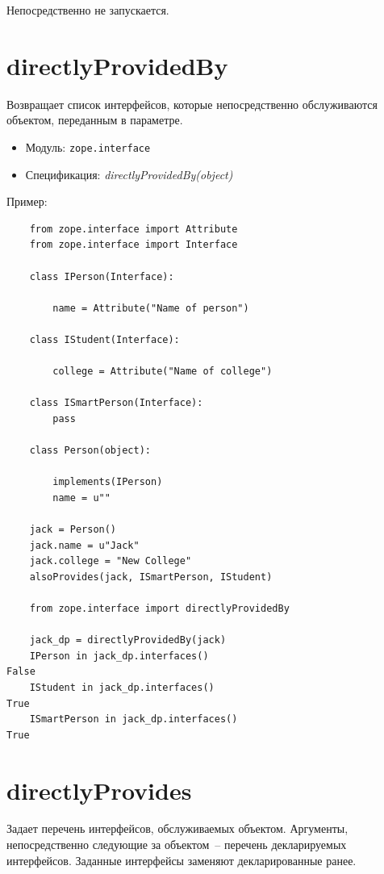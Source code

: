 \documentclass[a4paper,openany,twoside,final]{book}
\providecommand*{\DUroletitlereference}[1]{\textsl{#1}}
\begin{document}
Непосредственно не запускается.


\section*{directlyProvidedBy%
  \label{directlyprovidedby}%
}

Возвращает список интерфейсов, которые непосредственно обслуживаются объектом, переданным в параметре.

\begin{itemize}

\item Модуль: \texttt{zope.interface}

\item Спецификация: \DUroletitlereference{directlyProvidedBy(object)}

\end{itemize}

Пример:

\begin{verbatim}
    from zope.interface import Attribute
    from zope.interface import Interface

    class IPerson(Interface):

        name = Attribute("Name of person")

    class IStudent(Interface):

        college = Attribute("Name of college")

    class ISmartPerson(Interface):
        pass

    class Person(object):

        implements(IPerson)
        name = u""

    jack = Person()
    jack.name = u"Jack"
    jack.college = "New College"
    alsoProvides(jack, ISmartPerson, IStudent)

    from zope.interface import directlyProvidedBy

    jack_dp = directlyProvidedBy(jack)
    IPerson in jack_dp.interfaces()
False
    IStudent in jack_dp.interfaces()
True
    ISmartPerson in jack_dp.interfaces()
True
\end{verbatim}


\section*{directlyProvides%
  \label{directlyprovides}%
}

Задает перечень интерфейсов, обслуживаемых объектом.  Аргументы, непосредственно следующие за объектом~-- перечень декларируемых интерфейсов.  Заданные интерфейсы заменяют декларированные ранее.
\end{document}
